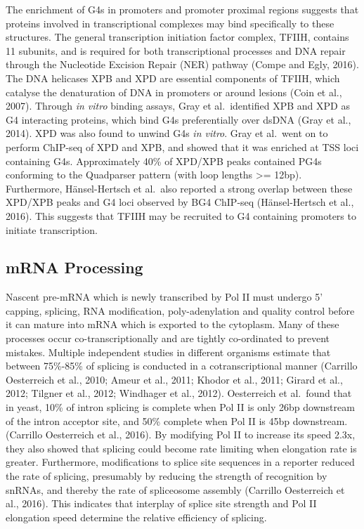 \documentclass[12pt,a4paper,]{report}
\begin{document}
The enrichment of G4s in promoters and promoter proximal regions
suggests that proteins involved in transcriptional complexes may bind
specifically to these structures. The general transcription initiation
factor complex, TFIIH, contains 11 subunits, and is required for both
transcriptional processes and DNA repair through the Nucleotide Excision
Repair (NER) pathway (Compe and Egly, 2016). The DNA helicases XPB and
XPD are essential components of TFIIH, which catalyse the denaturation
of DNA in promoters or around lesions (Coin et al., 2007). Through
\emph{in vitro} binding assays, Gray et al.~identified XPB and XPD as G4
interacting proteins, which bind G4s preferentially over dsDNA (Gray et
al., 2014). XPD was also found to unwind G4s \emph{in vitro}. Gray et
al.~went on to perform ChIP-seq of XPD and XPB, and showed that it was
enriched at TSS loci containing G4s. Approximately 40\% of XPD/XPB peaks
contained PG4s conforming to the Quadparser pattern (with loop lengths
\textgreater{}= 12bp). Furthermore, Hänsel-Hertsch et al.~also reported
a strong overlap between these XPD/XPB peaks and G4 loci observed by BG4
ChIP-seq (Hänsel-Hertsch et al., 2016). This suggests that TFIIH may be
recruited to G4 containing promoters to initiate transcription.

\newpage

\hypertarget{mrna-processing}{%
\subsection{mRNA Processing}\label{mrna-processing}}

\label{ssec:mrna_processing}

Nascent pre-mRNA which is newly transcribed by Pol II must undergo 5'
capping, splicing, RNA modification, poly-adenylation and quality
control before it can mature into mRNA which is exported to the
cytoplasm. Many of these processes occur co-transcriptionally and are
tightly co-ordinated to prevent mistakes. Multiple independent studies
in different organisms estimate that between 75\%-85\% of splicing is
conducted in a cotranscriptional manner (Carrillo Oesterreich et al.,
2010; Ameur et al., 2011; Khodor et al., 2011; Girard et al., 2012;
Tilgner et al., 2012; Windhager et al., 2012). Oesterreich et al.~found
that in yeast, 10\% of intron splicing is complete when Pol II is only
26bp downstream of the intron acceptor site, and 50\% complete when Pol
II is 45bp downstream. (Carrillo Oesterreich et al., 2016). By modifying
Pol II to increase its speed 2.3x, they also showed that splicing could
become rate limiting when elongation rate is greater. Furthermore,
modifications to splice site sequences in a reporter reduced the rate of
splicing, presumably by reducing the strength of recognition by snRNAs,
and thereby the rate of spliceosome assembly (Carrillo Oesterreich et
al., 2016). This indicates that interplay of splice site strength and
Pol II elongation speed determine the relative efficiency of splicing.
\end{document}
